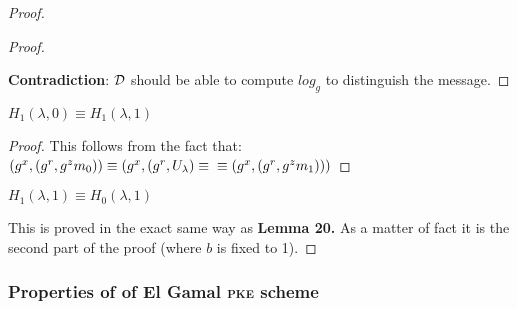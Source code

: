 \begin{proof}
\begin{proof}
\begin{figure}[h!]
        \end{figure}

        \textbf{Contradiction}: $\mathcal{D}$ should be able to compute $log_g$ to distinguish the message.

    \end{proof}

    \begin{lemma}
        $H_1(\lambda,0)\equiv H_1(\lambda,1)$
    \end{lemma}
    \begin{proof}
        This follows from the fact that:
        $(g^x,(g^r,g^z m_0))\equiv (g^x,(g^r,U_{\lambda}) \equiv \\ \equiv (g^x,(g^r,g^z m_1)))$
    \end{proof}
    
    \begin{lemma}
        $H_1(\lambda,1)\equiv H_0(\lambda,1)$
    \end{lemma}
    This is proved in the exact same way as \textbf{Lemma 20.} As a matter of fact it is the second part of the proof (where $b$ is fixed to 1).
    
\end{proof}

\subsubsection{Properties of of El Gamal \textsc{pke} scheme}

